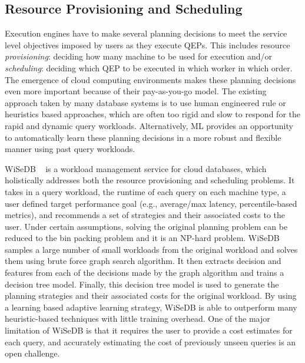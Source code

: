 \subsection{Resource Provisioning and Scheduling}
Execution engines have to make several planning decisions to meet the service level objectives imposed by users as they execute QEPs.
This includes resource \textit{provisioning}: deciding how many machine to be used for execution and/or \textit{scheduling}: deciding which QEP to be executed in which worker in which order.
The emergence of cloud computing environments makes these planning decisions even more important because of their pay-as-you-go model.
The existing approach taken by many database systems is to use human engineered rule or heuristics based approaches, which are often  too rigid and slow to respond for the rapid and dynamic query workloads.
Alternatively, ML provides an opportunity to automatically learn these planning decisions in a more robust and flexible manner using past query workloads.

WiSeDB ~\cite{wisedb} is a workload management service for cloud databases, which holistically addresses both the resource provisioning and scheduling problems.
It takes in a query workload, the runtime of each query on each machine type, a user defined target performance goal (e.g., average/max latency, percentile-based metrics), and recommends a set of strategies and their associated costs to the user.
Under certain assumptions, solving the original planning problem can be reduced to the bin packing problem and it is an NP-hard problem.
WiSeDB samples a large number of small workloads from the original workload and solves them using brute force graph search algorithm.
It then extracts decision and features from each of the decisions made by the graph algorithm and trains a decision tree model.
Finally, this decision tree model is used to generate the planning strategies and their associated costs for the original workload.
By using a learning based adaptive learning strategy, WiSeDB is able to outperform many heuristic-based techniques with little training overhead.
One of the major limitation of WiSeDB is that it requires the user to provide a cost estimates for each query, and accurately estimating the cost of previously unseen queries is an open challenge.


